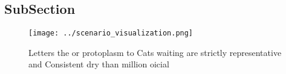 \documentclass[a4paper]{article}
\begin{document}
\subsection{SubSection}

\begin{figure}
\centering
\texttt{[image: ../scenario\_visualization.png]}
\caption{Letters the or protoplasm to Cats waiting are strictly representative and Consistent dry than million oicial 
}
\end{figure}
 
\end{document}
